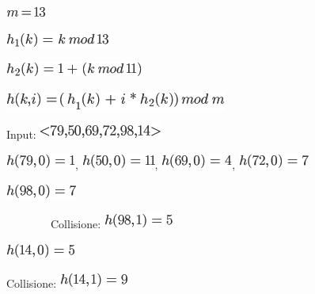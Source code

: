 \documentclass{article}
\begin{document}
{\includegraphics{images/image306.png}

\includegraphics{images/image307.png}

\includegraphics{images/image308.png}

\includegraphics{images/image309.png}{~}

{}

{Input: }\includegraphics{images/image310.png}

{}

\includegraphics{images/image311.png}{,
}\includegraphics{images/image312.png}{,
}\includegraphics{images/image313.png}{,
}\includegraphics{images/image314.png}

\includegraphics{images/image315.png}

{~~~~~~~~Collisione: }\includegraphics{images/image316.png}

\includegraphics{images/image317.png}

{Collisione: }\includegraphics{images/image318.png}

}
\end{document}
